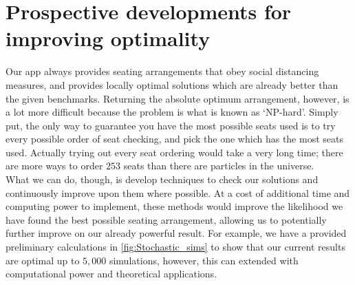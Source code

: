 \documentclass[11pt,a4paper]{article}
\begin{document}
\section*{Prospective developments for improving optimality}
Our app always provides seating arrangements that obey social distancing measures, and provides locally optimal solutions which are already better than the given benchmarks. Returning the  absolute optimum arrangement, however, is a lot more difficult because the problem is what is known as `NP-hard'.  Simply put, the only way to guarantee you have the most possible seats used is to try every possible order of seat checking, and pick the one which has the most seats used. Actually trying out every seat ordering would take a very long time; there are more ways to order $253$ seats than there are particles in the universe.\\

What we can do, though, is develop techniques to check our solutions and continuously improve upon them where possible. At a cost of additional time and computing power to implement, these methods would improve the likelihood we have found the best possible seating arrangement, allowing us to potentially further improve on our already powerful result. For example, we have a provided preliminary calculations in \autoref{fig:Stochastic_sims} to show that our current results are optimal up to $5,000$ simulations, however, this can extended with computational power and theoretical applications.\\
\end{document}
